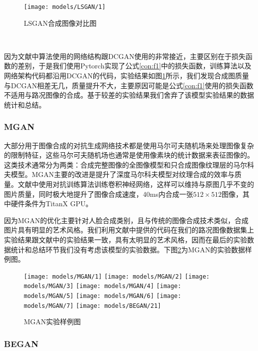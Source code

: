 \begin{figure}[h]
    \centering
    \texttt{[image: models/LSGAN/1]}
    \caption{LSGAN合成图像对比图}
    \label{fig:lsgan}
\end{figure}　

因为文献\cite{LSGAN}中算法使用的网络结构跟DCGAN\cite{dcgan}使用的非常接近，主要区别在于损失函数的差别，于是我们使用Pytorch实现了公式\ref{con:f1}中的损失函数，训练算法以及网络架构代码都沿用DCGAN的代码，实验结果如图\ref{fig:lsgan}所示，我们发现合成图质量与DCGAN相差无几，质量提升不大，主要原因可能是公式\ref{con:f1}使用的损失函数不适用与路况图像的合成。基于较差的实验结果我们舍弃了该模型实验结果的数据统计和总结。

\subsubsection{MGAN}

 大部分用于图像合成的对抗生成网络技术都是使用马尔可夫随机场来处理图像复杂的限制特征，这些马尔可夫随机场也通常是使用像素块的统计数据来表征图像的。这类技术通常分为两类：合成完整图像的全图像模型和只合成图像纹理层的马尔科夫模型。MGAN主要的改进是提升了深度马尔科夫模型对纹理合成的效率与质量。文献\cite{MGAN}中使用对抗训练\cite{adtrain}算法训练卷积神经网络，这样可以维持与原图几乎不变的图片质量，同时极大地提升了图像合成速度，40ms内合成一张$512\times 512$图像，其中硬件条件为TitanX GPU。

因为MGAN的优化主要针对人脸合成类别，且与传统的图像合成技术类似，合成图片具有明显的艺术风格。我们利用文献中提供的代码\cite{git:mgan}在我们的路况图像数据集上实验结果跟文献中的实验结果一致，具有太明显的艺术风格，因而在最后的实验数据统计和总结环节我们没有考虑该模型的实验数据。下图\ref{fig:mag}为MGAN的实验数据样例图。

\begin{figure}[h] 
    \centering
    \texttt{[image: models/MGAN/1]}
    \texttt{[image: models/MGAN/2]}
    \texttt{[image: models/MGAN/3]}
    \texttt{[image: models/MGAN/4]}
    \texttt{[image: models/MGAN/5]}
    \texttt{[image: models/MGAN/6]}
    \texttt{[image: models/MGAN/7]}
    \texttt{[image: models/BEGAN/21]}
    \caption{MGAN实验样例图}
    \label{fig:mag}
\end{figure}

\subsubsection{BEGAN}

